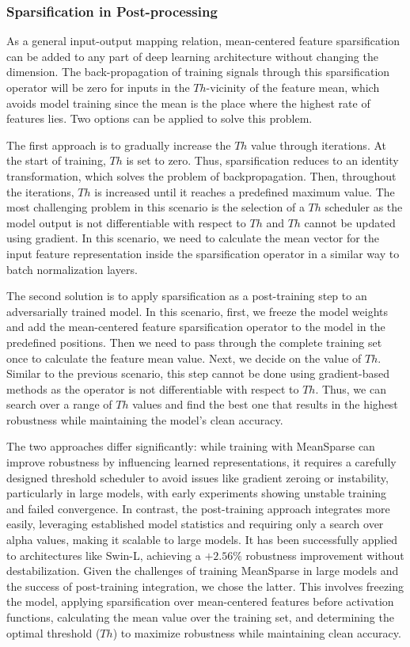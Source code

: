 \documentclass[conference]{IEEEtran}
\begin{document}
\subsubsection{Sparsification in Post-processing}
As a general input-output mapping relation, mean-centered feature sparsification can be added to any part of deep learning architecture without changing the dimension. The back-propagation of training signals through this sparsification operator will be zero for inputs in the $Th$-vicinity of the feature mean, which avoids model training since the mean is the place where the highest rate of features lies. Two options can be applied to solve this problem.  

The first approach is to gradually increase the $Th$ value through iterations. At the start of training, $Th$ is set to zero. Thus, sparsification reduces to an identity transformation, which solves the problem of backpropagation. Then, throughout the iterations, $Th$ is increased until it reaches a predefined maximum value. The most challenging problem in this scenario is the selection of a $Th$ scheduler as the model output is not differentiable with respect to $Th$ and $Th$ cannot be updated using gradient. In this scenario, we need to calculate the mean vector for the input feature representation inside the sparsification operator in a similar way to batch normalization layers.

The second solution is to apply sparsification as a post-training step to an adversarially trained model. In this scenario, first, we freeze the model weights and add the mean-centered feature sparsification operator to the model in the predefined positions. Then we need to pass through the complete training set once to calculate the feature mean value. Next, we decide on the value of $Th$. Similar to the previous scenario, this step cannot be done using gradient-based methods as the operator is not differentiable with respect to $Th$. Thus, we can search over a range of $Th$ values and find the best one that results in the highest robustness while maintaining the model's clean accuracy.

The two approaches differ significantly: while training with MeanSparse can improve robustness by influencing learned representations, it requires a carefully designed threshold scheduler to avoid issues like gradient zeroing or instability, particularly in large models, with early experiments showing unstable training and failed convergence. In contrast, the post-training approach integrates more easily, leveraging established model statistics and requiring only a search over alpha values, making it scalable to large models. It has been successfully applied to architectures like Swin-L, achieving a $+2.56\%$ robustness improvement without destabilization. Given the challenges of training MeanSparse in large models and the success of post-training integration, we chose the latter. This involves freezing the model, applying sparsification over mean-centered features before activation functions, calculating the mean value over the training set, and determining the optimal threshold ($Th$) to maximize robustness while maintaining clean accuracy.
\end{document}
